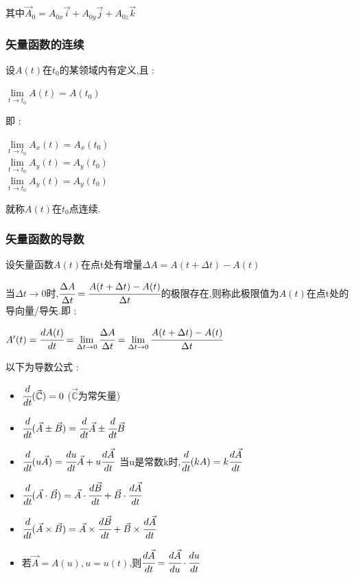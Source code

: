 \documentclass[UTF8,12pt]{ctexbook}
\newcommand{\limNormal}[1]{\lim\limits_{#1}}
\newcommand{\derivative}{^\prime}
\newcommand{\mathConstant}{\mathbb{C}}
\begin{document}
{{{{      其中$\vec{A}_0 = A_{0x}\vec{i} + A_{0y}\vec{j} + A_{0z}\vec{k}$
    }%

    \subsubsection{矢量函数的连续}{
      设$A(t)$在$t_0$的某领域内有定义,且 :

      \begin{center}
        $\limNormal{t \to t_0}A(t) = A(t_0)$
      \end{center}

      即 :

      \begin{center}
        $\limNormal{t \to t_0}A_x(t) = A_x(t_0)$ \\
        $\limNormal{t \to t_0}A_y(t) = A_y(t_0)$ \\
        $\limNormal{t \to t_0}A_y(t) = A_y(t_0)$
      \end{center}

      就称$A(t)$在$t_0$点连续.
    }%

    \subsubsection{矢量函数的导数}{
      设矢量函数$A(t)$在点t处有增量$\Delta A = A(t + \Delta t) - A(t)$

      当$\Delta t \to 0$时,$\cfrac{\Delta A}{\Delta t} = \cfrac{A(t + \Delta t) - A(t)}{\Delta t}$的极限存在,则称此极限值为$A(t)$在点t处的导向量/导矢.即 :

      \begin{center}
        $A\derivative(t) = \cfrac{dA(t)}{dt} = \limNormal{\Delta t \to 0}\cfrac{\Delta A}{\Delta t} = \limNormal{\Delta t \to 0}\cfrac{A(t + \Delta t) - A(t)}{\Delta t}$
      \end{center}

      以下为导数公式 :

      \begin{itemize}
        \item $\cfrac{d}{dt}(\vec{\mathConstant}) = 0$ ($\vec{\mathConstant}$为常矢量)
        \item $\cfrac{d}{dt}(\vec{A} \pm \vec{B}) = \cfrac{d}{dt}\vec{A} \pm \cfrac{d}{dt}\vec{B}$
        \item $\cfrac{d}{dt}(u\vec{A}) = \cfrac{du}{dt}\vec{A} + u\cfrac{d\vec{A}}{dt}$\ 当u是常数k时,$\cfrac{d}{dt}(kA) = k\cfrac{d\vec{A}}{dt}$
        \item $\cfrac{d}{dt}(\vec{A}\cdot\vec{B}) = \vec{A}\cdot\cfrac{d\vec{B}}{dt} + \vec{B}\cdot\cfrac{d\vec{A}}{dt}$
        \item $\cfrac{d}{dt}(\vec{A}\times\vec{B}) = \vec{A}\times\cfrac{d\vec{B}}{dt} + \vec{B}\times\cfrac{d\vec{A}}{dt}$
        \item 若$\vec{A} = A(u),u = u(t)$,则$\cfrac{d\vec{A}}{dt} = \cfrac{d\vec{A}}{du}\cdot\cfrac{du}{dt}$
      \end{itemize}

}}}}
\end{document}
